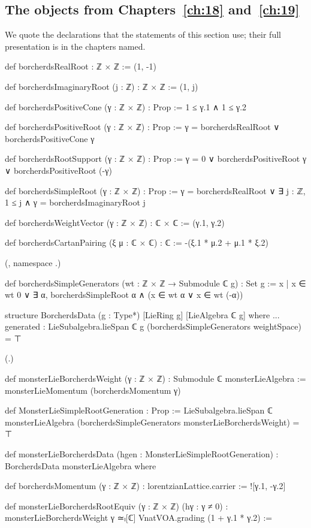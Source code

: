 \subsection{The objects from Chapters~\ref{ch:18} and~\ref{ch:19}}

We quote the declarations that the statements of this section use; their full presentation is in the chapters named.

\begin{leancode}
def borcherdsRealRoot : ℤ × ℤ := (1, -1)

def borcherdsImaginaryRoot (j : ℤ) : ℤ × ℤ := (1, j)

def borcherdsPositiveCone (γ : ℤ × ℤ) : Prop := 1 ≤ γ.1 ∧ 1 ≤ γ.2

def borcherdsPositiveRoot (γ : ℤ × ℤ) : Prop :=
  γ = borcherdsRealRoot ∨ borcherdsPositiveCone γ

def borcherdsRootSupport (γ : ℤ × ℤ) : Prop :=
  γ = 0 ∨ borcherdsPositiveRoot γ ∨ borcherdsPositiveRoot (-γ)

def borcherdsSimpleRoot (γ : ℤ × ℤ) : Prop :=
  γ = borcherdsRealRoot ∨ ∃ j : ℤ, 1 ≤ j ∧ γ = borcherdsImaginaryRoot j

def borcherdsWeightVector (γ : ℤ × ℤ) : ℂ × ℂ := (γ.1, γ.2)

def borcherdsCartanPairing (ξ μ : ℂ × ℂ) : ℂ := -(ξ.1 * μ.2 + μ.1 * ξ.2)
\end{leancode}
(, namespace .)
\begin{leancode}
def borcherdsSimpleGenerators (wt : ℤ × ℤ → Submodule ℂ g) : Set g :=
  {x | x ∈ wt 0 ∨ ∃ α, borcherdsSimpleRoot α ∧ (x ∈ wt α ∨ x ∈ wt (-α))}

structure BorcherdsData (g : Type*) [LieRing g] [LieAlgebra ℂ g] where
  ...
  generated : LieSubalgebra.lieSpan ℂ g (borcherdsSimpleGenerators weightSpace) = ⊤
\end{leancode}
(.)
\begin{leancode}
def monsterLieBorcherdsWeight (γ : ℤ × ℤ) : Submodule ℂ monsterLieAlgebra :=
  monsterLieMomentum (borcherdsMomentum γ)

def MonsterLieSimpleRootGeneration : Prop :=
  LieSubalgebra.lieSpan ℂ monsterLieAlgebra (borcherdsSimpleGenerators monsterLieBorcherdsWeight) =
    ⊤

def monsterLieBorcherdsData (hgen : MonsterLieSimpleRootGeneration) :
    BorcherdsData monsterLieAlgebra where

def borcherdsMomentum (γ : ℤ × ℤ) : lorentzianLattice.carrier := ![γ.1, -γ.2]

def monsterLieBorcherdsRootEquiv (γ : ℤ × ℤ) (hγ : γ ≠ 0) :
    monsterLieBorcherdsWeight γ ≃ₗ[ℂ] VnatVOA.grading (1 + γ.1 * γ.2) :=
\end{leancode}
